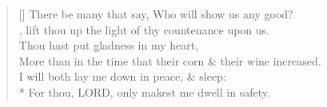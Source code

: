 \documentclass[MAIN]{subfiles}
\begin{document}
\settowidth{\versewidth}{There be many that say, Who will show us any good?}
\begin{verse}[\versewidth]
There be many that say, Who will show us any good?\\
, lift thou up the light of thy countenance upon us.\\
Thou hast put gladness in my heart,\\
\vin More than in the time that their corn \& their wine increased.\\
I will both lay me down in peace, \& sleep:\\*
\vin For thou, {\hge LORD}, only makest me dwell in safety.
\end{verse}
\end{document}
